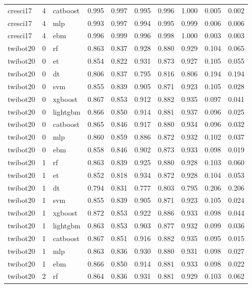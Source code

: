 \begin{tabular}{lrlrrrrrrr}
cresci17 & 4 & catboost & 0.995 & 0.997 & 0.995 & 0.996 & 1.000 & 0.005 & 0.002 \\
cresci17 & 4 & mlp & 0.993 & 0.997 & 0.994 & 0.995 & 0.999 & 0.006 & 0.006 \\
cresci17 & 4 & ebm & 0.996 & 0.999 & 0.996 & 0.998 & 1.000 & 0.003 & 0.003 \\
twibot20 & 0 & rf & 0.863 & 0.837 & 0.928 & 0.880 & 0.929 & 0.104 & 0.065 \\
twibot20 & 0 & et & 0.854 & 0.822 & 0.931 & 0.873 & 0.927 & 0.105 & 0.055 \\
twibot20 & 0 & dt & 0.806 & 0.837 & 0.795 & 0.816 & 0.806 & 0.194 & 0.194 \\
twibot20 & 0 & svm & 0.855 & 0.839 & 0.905 & 0.871 & 0.923 & 0.105 & 0.028 \\
twibot20 & 0 & xgboost & 0.867 & 0.853 & 0.912 & 0.882 & 0.935 & 0.097 & 0.041 \\
twibot20 & 0 & lightgbm & 0.866 & 0.850 & 0.914 & 0.881 & 0.937 & 0.096 & 0.025 \\
twibot20 & 0 & catboost & 0.865 & 0.846 & 0.917 & 0.880 & 0.934 & 0.096 & 0.032 \\
twibot20 & 0 & mlp & 0.860 & 0.859 & 0.886 & 0.872 & 0.932 & 0.102 & 0.037 \\
twibot20 & 0 & ebm & 0.858 & 0.846 & 0.902 & 0.873 & 0.933 & 0.098 & 0.019 \\
twibot20 & 1 & rf & 0.863 & 0.839 & 0.925 & 0.880 & 0.928 & 0.103 & 0.060 \\
twibot20 & 1 & et & 0.852 & 0.818 & 0.934 & 0.872 & 0.928 & 0.104 & 0.053 \\
twibot20 & 1 & dt & 0.794 & 0.831 & 0.777 & 0.803 & 0.795 & 0.206 & 0.206 \\
twibot20 & 1 & svm & 0.855 & 0.839 & 0.905 & 0.871 & 0.923 & 0.105 & 0.024 \\
twibot20 & 1 & xgboost & 0.872 & 0.853 & 0.922 & 0.886 & 0.933 & 0.098 & 0.044 \\
twibot20 & 1 & lightgbm & 0.863 & 0.853 & 0.903 & 0.877 & 0.932 & 0.099 & 0.036 \\
twibot20 & 1 & catboost & 0.867 & 0.851 & 0.916 & 0.882 & 0.935 & 0.095 & 0.015 \\
twibot20 & 1 & mlp & 0.863 & 0.836 & 0.930 & 0.880 & 0.931 & 0.098 & 0.027 \\
twibot20 & 1 & ebm & 0.866 & 0.850 & 0.914 & 0.881 & 0.933 & 0.098 & 0.022 \\
twibot20 & 2 & rf & 0.864 & 0.836 & 0.931 & 0.881 & 0.929 & 0.103 & 0.062 \\

\end{tabular}
